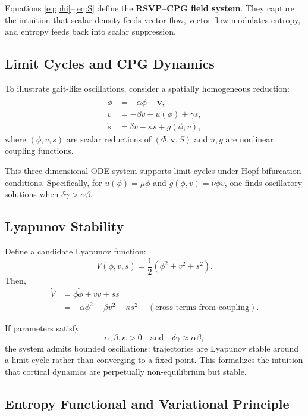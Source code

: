 \documentclass{article}
\begin{document}
Equations \eqref{eq:phi}--\eqref{eq:S} define the \textbf{RSVP--CPG field system}. 
They capture the intuition that scalar density feeds vector flow, vector flow modulates entropy, and entropy 
feeds back into scalar suppression.

\subsection{Limit Cycles and CPG Dynamics}

To illustrate gait-like oscillations, consider a spatially homogeneous reduction:
\begin{align}
\dot{\phi} &= -\alpha \phi + \mathbf{v}, \\
\dot{v} &= -\beta v - u(\phi) + \gamma s, \\
\dot{s} &= \delta v - \kappa s + g(\phi,v),
\end{align}
where $(\phi,v,s)$ are scalar reductions of $(\Phi,\mathbf{v},S)$ and $u, g$ are nonlinear coupling functions.

This three-dimensional ODE system supports limit cycles under Hopf bifurcation conditions. 
Specifically, for $u(\phi) = \mu \phi$ and $g(\phi,v) = \nu \phi v$, 
one finds oscillatory solutions when $\delta \gamma > \alpha \beta$.

\subsection{Lyapunov Stability}

Define a candidate Lyapunov function:
\begin{equation}
V(\phi,v,s) = \frac{1}{2}\left( \phi^2 + v^2 + s^2 \right).
\end{equation}
Then,
\begin{align}
\dot{V} &= \phi \dot{\phi} + v \dot{v} + s \dot{s} \\
&= -\alpha \phi^2 - \beta v^2 - \kappa s^2 + (\text{cross-terms from coupling}). 
\end{align}

If parameters satisfy
\[
\alpha, \beta, \kappa > 0 \quad \text{and} \quad \delta \gamma \approx \alpha \beta,
\]
the system admits bounded oscillations: trajectories are Lyapunov stable 
around a limit cycle rather than converging to a fixed point. 
This formalizes the intuition that cortical dynamics are perpetually non-equilibrium but stable.

\subsection{Entropy Functional and Variational Principle}
\end{document}
